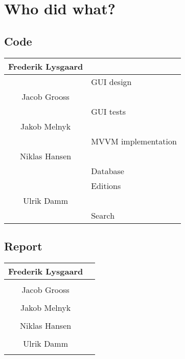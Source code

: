 \chapter{Who did what?}
\label{Appendix_Who}

\section{Code}
\label{Appendix_Who}
\begin{longtable}{| c | p{5cm} |}
\hline
Frederik Lysgaard & \\
\hline
& GUI design\\
\hline
Jacob Grooss & \\
\hline
& GUI tests\\
\hline
Jakob Melnyk & \\
\hline
& MVVM implementation\\
\hline
Niklas Hansen & \\
\hline
& Database\\
\hline
& Editions\\
\hline 
Ulrik Damm & \\
\hline
& Search\\
\hline
\end{longtable}

\section{Report}
\label{Appendix_Who}
\begin{centering}
\begin{longtable}{| c | p{5cm} |}
\hline
Frederik Lysgaard & \\
\hline
& \\
\hline
Jacob Grooss & \\
\hline
& \\
\hline
Jakob Melnyk & \\
\hline
& \\
\hline
Niklas Hansen & \\
\hline
& \\
\hline
Ulrik Damm & \\
\hline
& \\
\hline
\end{longtable}
\end{centering}